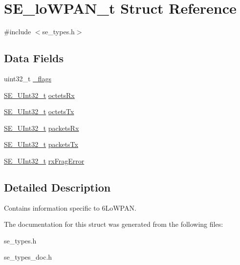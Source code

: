 \hypertarget{structSE__loWPAN__t}{}\section{S\+E\+\_\+lo\+W\+P\+A\+N\+\_\+t Struct Reference}
\label{structSE__loWPAN__t}


{\ttfamily \#include $<$se\+\_\+types.\+h$>$}

\subsection*{Data Fields}
\begin{DoxyCompactItemize}
\item 
uint32\+\_\+t \hyperlink{group__loWPAN_gab083d76b8f124eb2b3cb3a4cd7094116}{\+\_\+flags}
\item 
\hyperlink{group__UInt32_ga70bd4ecda3c0c85d20779d685a270cdb}{S\+E\+\_\+\+U\+Int32\+\_\+t} \hyperlink{group__loWPAN_ga180bdc9789d931b6914aa16241bbbf8d}{octets\+Rx}
\item 
\hyperlink{group__UInt32_ga70bd4ecda3c0c85d20779d685a270cdb}{S\+E\+\_\+\+U\+Int32\+\_\+t} \hyperlink{group__loWPAN_gabf0fae7d35cec99a725c1f893d048896}{octets\+Tx}
\item 
\hyperlink{group__UInt32_ga70bd4ecda3c0c85d20779d685a270cdb}{S\+E\+\_\+\+U\+Int32\+\_\+t} \hyperlink{group__loWPAN_gaa3c772f3cc59ca141b1b8d8f405baf09}{packets\+Rx}
\item 
\hyperlink{group__UInt32_ga70bd4ecda3c0c85d20779d685a270cdb}{S\+E\+\_\+\+U\+Int32\+\_\+t} \hyperlink{group__loWPAN_ga4052b1da9bfea628b6d61abc0d4c1edd}{packets\+Tx}
\item 
\hyperlink{group__UInt32_ga70bd4ecda3c0c85d20779d685a270cdb}{S\+E\+\_\+\+U\+Int32\+\_\+t} \hyperlink{group__loWPAN_gac2ecf874c1830af68defca2dce2d3af4}{rx\+Frag\+Error}
\end{DoxyCompactItemize}


\subsection{Detailed Description}
Contains information specific to 6\+Lo\+W\+P\+AN. 

The documentation for this struct was generated from the following files\+:\begin{DoxyCompactItemize}
\item 
se\+\_\+types.\+h\item 
se\+\_\+types\+\_\+doc.\+h\end{DoxyCompactItemize}
